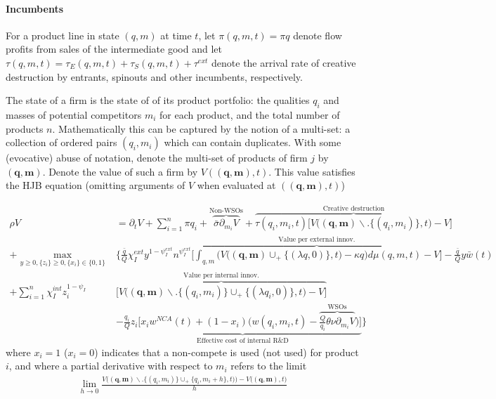 \documentclass[12pt,english]{article}
\theoremstyle{remark}
\begin{document}
\paragraph{Incumbents}

For a product line in state $(q,m)$ at time $t$, let $\pi(q,m,t) = \pi q$ denote flow profits from sales of the intermediate good and let $\tau(q,m,t) = \tau_E(q,m,t) + \tau_S(q,m,t) + \tau^{ext}$ denote the arrival rate of creative destruction by entrants, spinouts and other incumbents, respectively. 

The state of a firm is the state of of its product portfolio: the qualities $q_i$ and masses of potential competitors $m_i$ for each product, and the total number of products $n$. Mathematically this can be captured by the notion of a multi-set: a collection of ordered pairs $(q_i,m_i)$ which can contain duplicates. With some (evocative) abuse of notation, denote the multi-set of products of firm $j$ by $(\mathbf{q},\mathbf{m})$. Denote the value of such a firm by $V((\mathbf{q},\mathbf{m}),t)$. This value satisfies the HJB equation (omitting arguments of $V$ when evaluated at $(\mathbf{(q,m)},t)$)

\small
\begin{align}
	\rho V &= \partial_t V + \sum_{i=1}^n \pi q_i + \overbrace{\bar{\sigma} \partial_{m_i} V}^{\textrm{Non-WSOs}} + \overbrace{\tau(q_i,m_i,t) \Bigg[ V\Big(\mathbf{(q,m)} \backslash . \{(q_i,m_i)\},t \Big) -V  \Bigg]}^{\textrm{Creative destruction}} \nonumber \\
	  + \max_{y \ge 0, \{z_{i}\} \ge 0, \{x_{i}\} \in \{0,1\}}& \Bigg\{ \frac{\bar{q}}{Q} \chi_I^{ext} y^{1-\psi_I^{ext}} n^{\psi_I^{ext}} \overbrace{\Bigg[ \int_{q,m} \Bigg( V\Big(\mathbf{(q,m)} \cup_+ \{(\lambda q,0)\},t \Big) - \kappa q  \Bigg) d\mu(q,m,t) - V   \Bigg]}^{\textrm{Value per external innov.}}- \frac{\bar{q}}{Q}y \bar{w}(t)   \nonumber \\
	  + \sum_{i=1}^n \chi_I^{int} z_{i}^{1-\psi_I} &\overbrace{\Bigg[ V\Big(\mathbf{(q,m)} \backslash . \{(q_i,m_i)\} \cup_+ \{(\lambda q_i,0) \},t\Big) - V \Bigg]}^{\textrm{Value per internal innov.}}  \nonumber \\ 
	  &- \underbrace{\frac{q_i}{Q} z_{i} \Bigg[ x_i w^{NCA}(t) + (1-x_i) \Big( w(q_i,m_i,t) - \overbrace{ \frac{Q}{q_i} \theta \nu \partial_{m_i}V}^{\textrm{WSOs}}\Big) \Bigg]}_{\textrm{Effective cost of internal R\&D}}\Bigg\} \label{HJB_I_general}
\end{align}
\normalsize
where $x_i = 1$ ($x_i = 0$) indicates that a non-compete is used (not used) for product $i$, and where a partial derivative with respect to $m_i$ refers to the limit
\begin{align*}
	\lim_{h \to 0} \frac{V\Big( (\mathbf{q},\mathbf{m} ) \backslash . \{ (q_i,m_i)\} \cup_+ \{q_i,m_i + h\},t) \Big) - V\Big((\mathbf{q},\mathbf{m}) , t\Big)}{h}
\end{align*}
\end{document}
